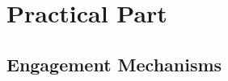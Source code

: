 \documentclass[aspectratio=169]{beamer}
\begin{document}


\section{Practical Part}
\subsection{Engagement Mechanisms}
\end{document}
